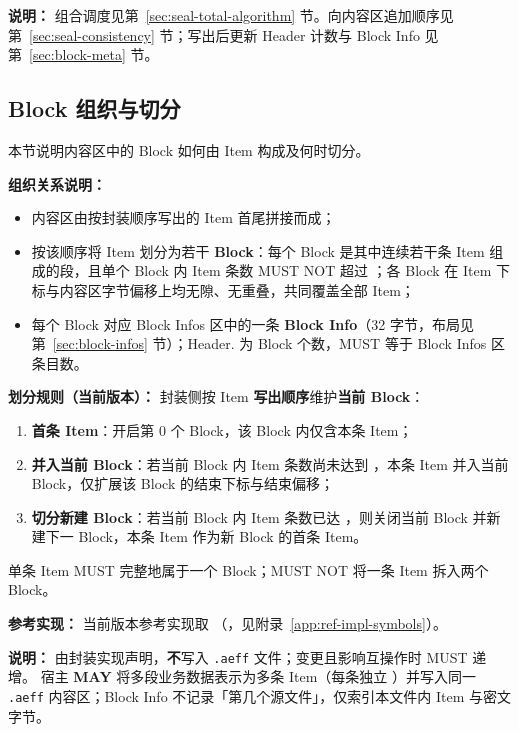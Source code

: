 \textbf{说明：}
组合调度见第~\ref{sec:seal-total-algorithm} 节。向内容区追加顺序见第~\ref{sec:seal-consistency} 节；写出后更新 Header 计数与 Block Info 见第~\ref{sec:block-meta} 节。

\subsection{Block 组织与切分}\label{sec:block-split}
本节说明内容区中的 Block 如何由 Item 构成及何时切分。

\textbf{组织关系说明：}
\begin{itemize}
  \item 内容区由按封装顺序写出的 Item 首尾拼接而成；
  \item 按该顺序将 Item 划分为若干 \textbf{Block}：每个 Block 是其中连续若干条 Item 组成的段，且单个 Block 内 Item 条数 MUST NOT 超过 ；各 Block 在 Item 下标与内容区字节偏移上均无隙、无重叠，共同覆盖全部 Item；
  \item 每个 Block 对应 Block Infos 区中的一条 \textbf{Block Info}（32 字节，布局见第~\ref{sec:block-infos} 节）；Header. 为 Block 个数，MUST 等于 Block Infos 区条目数。
\end{itemize}

\textbf{划分规则（当前版本）：}
封装侧按 Item \textbf{写出顺序}维护\textbf{当前 Block}：
\begin{enumerate}
  \item \textbf{首条 Item}：开启第 0 个 Block，该 Block 内仅含本条 Item；
  \item \textbf{并入当前 Block}：若当前 Block 内 Item 条数尚未达到 ，本条 Item 并入当前 Block，仅扩展该 Block 的结束下标与结束偏移；
  \item \textbf{切分新建 Block}：若当前 Block 内 Item 条数已达 ，则关闭当前 Block 并新建下一 Block，本条 Item 作为新 Block 的首条 Item。
\end{enumerate}
单条 Item MUST 完整地属于一个 Block；MUST NOT 将一条 Item 拆入两个 Block。

\textbf{参考实现：}
当前版本参考实现取 （，见附录~\ref{app:ref-impl-symbols}）。

\textbf{说明：}
 由封装实现声明，\textbf{不}写入 \texttt{.aeff} 文件；变更且影响互操作时  MUST 递增。
宿主 \textbf{MAY} 将多段业务数据表示为多条 Item（每条独立 ）并写入同一 \texttt{.aeff} 内容区；Block Info 不记录「第几个源文件」，仅索引本文件内 Item 与密文字节。

